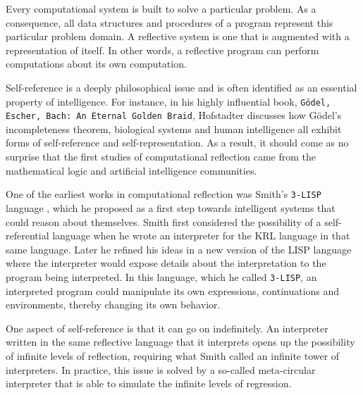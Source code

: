 
Every computational system is built to solve a particular problem. As a consequence, all data structures and procedures
of a program represent this particular problem domain. A reflective system is one that is augmented with a representation
of itself. In other words, a reflective program can perform computations about its own computation.

Self-reference is a deeply philosophical issue and is often identified as an essential property of intelligence. For instance,
in his highly influential book, \texttt{Gödel, Escher, Bach: An Eternal Golden Braid}, Hofstadter \cite{Hofstadter} discusses how
Gödel's incompleteness theorem, biological systems and human intelligence all exhibit forms of self-reference and
self-representation. As a result, it should come as no surprise that the first studies of computational reflection came
from the mathematical logic and artificial intelligence communities.

One of the earliest works in computational reflection was Smith's \texttt{3-LISP} language \cite{Smith}, which he proposed as a first step towards
intelligent systems that could reason about themselves. Smith first considered the possibility of a self-referential language
when he wrote an interpreter for the KRL language in that same language. Later he refined his ideas in a new version of the
LISP language where the interpreter would expose details about the interpretation to the program being interpreted. In this language,
which he called \texttt{3-LISP}, an interpreted program could manipulate its own expressions, continuations and environments, thereby
changing its own behavior.

One aspect of self-reference is that it can go on indefinitely. An interpreter written in the same reflective language that it
interprets opens up the possibility of infinite levels of reflection, requiring what Smith called an infinite tower of interpreters.
In practice, this issue is solved by a so-called meta-circular interpreter that is able to simulate the infinite levels of regression.


